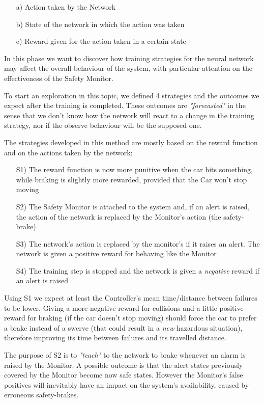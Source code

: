 \begin{itemize}
	\item[a)] Action taken by the Network
	\item[b)] State of the network in which the action was taken
	\item[c)] Reward given for the action taken in a certain state
\end{itemize}

In this phase we want to discover how training strategies for the neural network may affect the overall behaviour of the system, with particular attention on the effectiveness of the Safety Monitor.

To start an exploration in this topic, we defined 4 strategies and the outcomes we expect after the training is completed. These outcomes are \textsl{"forecasted"} in the sense that we don't know how the network will react to a change in the training strategy, nor if the observe behaviour will be the supposed one.

The strategies developed in this method are mostly based on the reward function and on the actions taken by the network:

\begin{itemize}
	\item[S1)] The reward function is now more punitive when the car hits something, while braking is slightly more rewarded, provided that the Car won't stop moving
	\item[S2)] The Safety Monitor is attached to the system and, if an alert is raised, the action of the network is replaced by the Monitor's action (the safety-brake)
	\item[S3)] The network's action is replaced by the monitor's if it raises an alert. The network is given a positive reward for behaving like the Monitor
	\item[S4)] The training step is stopped and the network is given a \textsl{negative} reward if an alert is raised
\end{itemize}

Using S1 we expect at least the Controller's mean time/distance between failures to be lower. Giving a more negative reward for collisions and a little positive reward for braking (if the car doesn't stop moving) should force the car to prefer a brake instead of a swerve (that could result in a \textsl{new} hazardous situation), therefore improving its time between failures and its travelled distance.

The purpose of S2 is to \textsl{"teach"} to the network to brake whenever an alarm is raised by the Monitor. A possible outcome is that the alert states previously covered by the Monitor become now safe states. However the Monitor's false positives will inevitably have an impact on the system's availability, caused by erroneous safety-brakes.

